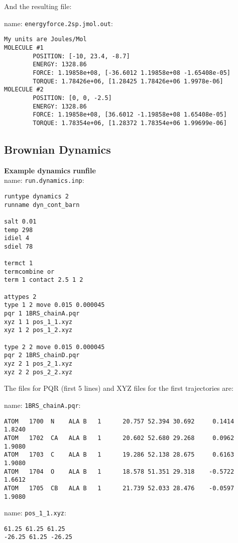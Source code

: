 And the resulting file: 

name: \texttt{energyforce.2sp.jmol.out}:
\begin{lstlisting}[style = MyBash]
My units are Joules/Mol
MOLECULE #1
        POSITION: [-10, 23.4, -8.7]
        ENERGY: 1328.86
        FORCE: 1.19858e+08, [-36.6012 1.19858e+08 -1.65408e-05]
        TORQUE: 1.78426e+06, [1.28425 1.78426e+06 1.9978e-06]
MOLECULE #2
        POSITION: [0, 0, -2.5]
        ENERGY: 1328.86
        FORCE: 1.19858e+08, [36.6012 -1.19858e+08 1.65408e-05]
        TORQUE: 1.78354e+06, [1.28372 1.78354e+06 1.99699e-06]
\end{lstlisting}


\subsection{Brownian Dynamics}

\textbf{Example dynamics runfile} \\

name:  \texttt{run.dynamics.inp}:
\begin{lstlisting}[style = MyBash]
runtype dynamics 2
runname dyn_cont_barn

salt 0.01
temp 298
idiel 4 
sdiel 78

termct 1
termcombine or
term 1 contact 2.5 1 2

attypes 2
type 1 2 move 0.015 0.000045
pqr 1 1BRS_chainA.pqr
xyz 1 1 pos_1_1.xyz
xyz 1 2 pos_1_2.xyz

type 2 2 move 0.015 0.000045
pqr 2 1BRS_chainD.pqr
xyz 2 1 pos_2_1.xyz
xyz 2 2 pos_2_2.xyz
\end{lstlisting}
\medskip

The files for PQR (first 5 lines) and XYZ files for the first trajectories are: 

name:  \texttt{1BRS\_chainA.pqr}:
\begin{lstlisting}[style = MyBash]
ATOM   1700  N    ALA B   1      20.757 52.394 30.692     0.1414  1.8240
ATOM   1702  CA   ALA B   1      20.602 52.680 29.268     0.0962  1.9080
ATOM   1703  C    ALA B   1      19.286 52.138 28.675     0.6163  1.9080
ATOM   1704  O    ALA B   1      18.578 51.351 29.318    -0.5722  1.6612
ATOM   1705  CB   ALA B   1      21.739 52.033 28.476    -0.0597  1.9080
\end{lstlisting}

\medskip

name:  \texttt{pos\_1\_1.xyz}:
\begin{lstlisting}[style = MyBash]
61.25 61.25 61.25
-26.25 61.25 -26.25
\end{lstlisting}
\medskip

